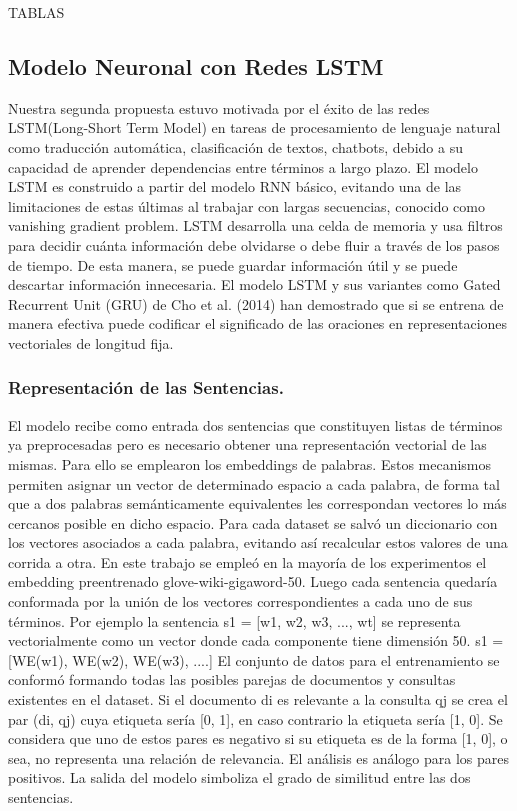 \documentclass{llncs}
\begin{document}
TABLAS

\subsection{Modelo Neuronal con Redes LSTM}

Nuestra segunda propuesta estuvo motivada por el éxito de las redes LSTM(Long-Short Term Model) en tareas de procesamiento de lenguaje natural como traducción automática, clasificación de textos, chatbots, debido a su capacidad de aprender dependencias entre términos a largo plazo. El modelo LSTM es construido a partir del modelo RNN básico, evitando una de las limitaciones de estas últimas al trabajar con largas secuencias, conocido como vanishing gradient problem. 
LSTM desarrolla una celda de memoria y usa filtros para decidir cuánta información debe olvidarse o debe fluir a través de los pasos de tiempo. De esta manera, se puede guardar información útil y se puede descartar información innecesaria. El modelo LSTM y sus variantes como Gated Recurrent Unit (GRU) de Cho et al. (2014) han demostrado que si se entrena de manera efectiva puede codificar el significado de las oraciones en representaciones vectoriales de longitud fija. 

\subsubsection{Representación de las Sentencias.}

El modelo recibe como entrada dos sentencias que constituyen listas de términos ya preprocesadas pero es necesario obtener una representación vectorial de las mismas. Para ello se emplearon los embeddings de palabras. Estos mecanismos permiten asignar un vector de determinado espacio a cada palabra, de forma tal que a dos palabras semánticamente equivalentes les correspondan vectores lo más cercanos posible en dicho espacio. Para cada dataset se salvó un diccionario con los vectores asociados a cada palabra, evitando así recalcular estos valores de una corrida a otra. En este trabajo se empleó en la mayoría de los experimentos el embedding preentrenado glove-wiki-gigaword-50. 
Luego cada sentencia quedaría conformada por la unión de los vectores correspondientes a cada uno de sus términos. Por ejemplo la sentencia s1 = [w1, w2, w3, ..., wt] se representa vectorialmente como un vector donde cada componente tiene dimensión 50. s1 = [WE(w1), WE(w2), WE(w3), ....]
El conjunto de datos para el entrenamiento se conformó formando todas las posibles parejas de documentos y consultas existentes en el dataset. Si el documento di es relevante a la consulta qj se crea el par (di, qj) cuya etiqueta sería [0, 1], en caso contrario la etiqueta sería [1, 0]. Se considera que uno de estos pares es negativo si su etiqueta es de la forma [1, 0], o sea, no representa una relación de relevancia. El análisis es análogo para los pares positivos. La salida del modelo simboliza el grado de similitud entre las dos sentencias.
\end{document}
